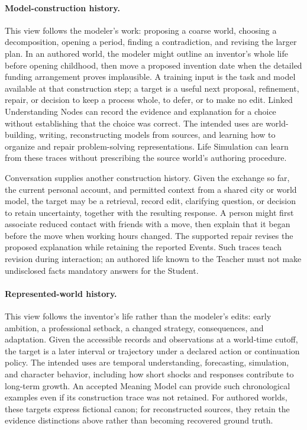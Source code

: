 \documentclass[10pt]{article}
\begin{document}
\paragraph{Model-construction history.}
This view follows the modeler's work: proposing a coarse world, choosing a
decomposition, opening a period, finding a contradiction, and revising the
larger plan. In an authored world, the modeler might outline an inventor's
whole life before opening childhood, then move a proposed invention date when
the detailed funding arrangement proves implausible. A training input is the
task and model available at that construction step; a target is a useful next
proposal, refinement, repair, or decision to keep a process whole, to defer,
or to make no edit. Linked Understanding Nodes
can record the evidence and explanation for a choice without establishing
that the choice was correct. The intended uses are world-building, writing,
reconstructing models from sources, and learning how to organize and repair
problem-solving representations. Life Simulation can learn from these traces
without prescribing the source world's authoring procedure.

Conversation supplies another construction history. Given the exchange so far,
the current personal account, and permitted context from a shared city or world
model, the target may be a retrieval, record edit, clarifying question, or
decision to retain uncertainty, together with the resulting response. A person
might first associate reduced contact with friends with a move, then explain
that it began before the move when working hours changed. The supported repair
revises the proposed explanation while retaining the reported Events. Such
traces teach revision during interaction; an authored life known to the Teacher
must not make undisclosed facts mandatory answers for the Student.

\paragraph{Represented-world history.}
This view follows the inventor's life rather than the modeler's edits: early
ambition, a professional setback, a changed strategy, consequences, and
adaptation. Given the accessible records and observations at a world-time
cutoff, the target is a later interval or trajectory under a declared action
or continuation policy. The intended uses are temporal understanding,
forecasting, simulation, and character behavior, including how short shocks
and responses contribute to long-term growth. An accepted Meaning Model can
provide such chronological examples even if its construction trace was not
retained. For authored worlds, these targets express fictional canon; for
reconstructed sources, they retain the evidence distinctions above rather
than becoming recovered ground truth.
\end{document}
